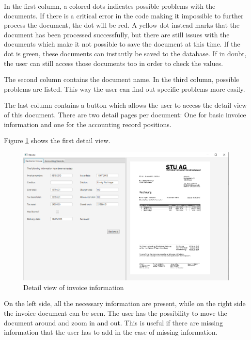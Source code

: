 In the first column, a colored dots indicates possible problems with the documents. If there is a critical error in the code making it impossible to further process the document, the dot will be red. 
A yellow dot instead marks that the document has been processed successfully, but there are still issues with the documents which make it not possible to save the document at this time.
If the dot is green, these documents can instantly be saved to the database. If in doubt, the user can still access those documents too in order to check the values.

The second column contains the document name. In the third column, possible problems are listed. This way the user can find out specific problems more easily.

The last column contains a button which allows the user to access the detail view of this document. There are two detail pages per document: One for basic invoice information and one for the accounting record positions.

Figure \ref{reviewElectronicInvoice} shows the first detail view.

\begin{figure}[htb!]
\centering
\includegraphics[width=\textwidth]{Images/GUI/reviewElectronicInvoice.png}
\caption{Detail view of invoice information \label{reviewElectronicInvoice}}
\end{figure}

On the left side, all the necessary information are present, while on the right side the invoice document can be seen. The user has the possibility to move the document around and zoom in and out. This is useful if there are missing information that the user has to add in the case of missing information.

